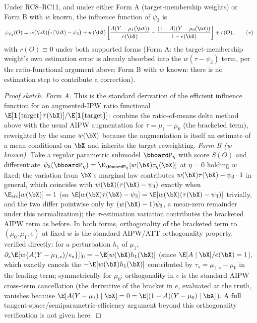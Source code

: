 \documentclass{article}
\renewcommand{\P}{\bboardP}
\begin{document}
\begin{proposition}
\label{prop:eif3}
Under RC8--RC11, and under either Form A (target-membership weights) or Form B with $w$ known, the influence function of $\psi_3$ is
\begin{equation}
\varphi_{\psi_3}(O) = w(\bX)\bigl(\tau(\bX)-\psi_3\bigr) + w(\bX)\left[\frac{A(Y-\mu_1(\bX))}{e(\bX)} - \frac{(1-A)(Y-\mu_0(\bX))}{1-e(\bX)}\right] + r(O), \tag{$\ast$}
\label{eq:eif3-unc}
\end{equation}
with $r(O)\equiv0$ under both supported forms (Form A: the target-membership weight's own estimation error is already absorbed into the $w(\tau-\psi_3)$ term, per the ratio-functional argument above; Form B with $w$ known: there is no estimation step to contribute a correction).
\end{proposition}

\begin{proof}[Proof sketch]
\emph{Form A.} This is the standard derivation of the efficient influence function for an augmented-IPW ratio functional $\E[\mathbf{1}\{\text{target}\}\tau(\bX)]/\E[\mathbf{1}\{\text{target}\}]$: combine the ratio-of-means delta method above with the usual AIPW augmentation for $\tau=\mu_1-\mu_0$ (the bracketed term), reweighted by the same $w(\bX)$ because the augmentation is itself an estimate of a mean conditional on $\bX$ and inherits the target reweighting. \emph{Form B (w known).} Take a regular parametric submodel $\P_\eta$ with score $S(O)$ and differentiate $\psi_3(\P_\eta)=\E_{\P_\eta}[w(\bX)\tau_\eta(\bX)]$ at $\eta=0$ holding $w$ fixed: the variation from $\bX$'s marginal law contributes $w(\bX)\tau(\bX)-\psi_3\cdot 1$ in general, which coincides with $w(\bX)(\tau(\bX)-\psi_3)$ exactly when $\E_{\mathrm{src}}[w(\bX)]=1$ (so $\E[w(\bX)\tau(\bX)-\psi_3]=\E[w(\bX)(\tau(\bX)-\psi_3)]$ trivially, and the two differ pointwise only by $(w(\bX)-1)\psi_3$, a mean-zero remainder under this normalization); the $\tau$-estimation variation contributes the bracketed AIPW term as before. In both forms, orthogonality of the bracketed term to $(\mu_0,\mu_1,e)$ at fixed $w$ is the standard AIPW/ATT orthogonality property, verified directly: for a perturbation $h_1$ of $\mu_1$, $\partial_s\E[w\{A(Y-\mu_{1,s})/e_s\}]|_0 = -\E[w(\bX)h_1(\bX)]$ (since $\E[A\mid\bX]/e(\bX)=1$), which exactly cancels the $-\E[w(\bX)h_1(\bX)]$ contributed by $\tau_s=\mu_{1,s}-\mu_0$ in the leading term; symmetrically for $\mu_0$; orthogonality in $e$ is the standard AIPW cross-term cancellation (the derivative of the bracket in $e$, evaluated at the truth, vanishes because $\E[A(Y-\mu_1)\mid\bX]=0=\E[(1-A)(Y-\mu_0)\mid\bX]$). A full tangent-space/semiparametric-efficiency argument beyond this orthogonality verification is not given here.
\end{proof}
\end{document}
